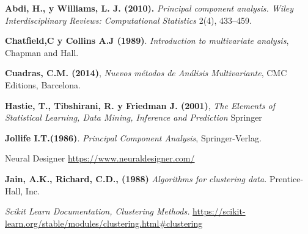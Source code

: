 
\begin{thebibliography}{99}
	

 \textbf{Abdi, H., y Williams, L. J. (2010).} \textit{Principal component analysis. Wiley Interdisciplinary Reviews: Computational Statistics}  2(4), 433–459. 

 \textbf{Chatfield,C y Collins A.J (1989)}. {\em Introduction to multivariate analysis}, Chapman and Hall.

 \textbf{Cuadras, C.M. (2014)}, \textit{Nuevos métodos de Análisis Multivariante}, CMC Editions, Barcelona. 

 \textbf{Hastie, T., Tibshirani, R. y Friedman J. (2001)}, \textit{The Elements of Statistical Learning, Data Mining, Inference and Prediction} Springer 

 \textbf{Jollife I.T.(1986)}. {\em Principal Component Analysis}, Springer-Verlag.

 Neural Designer \url{https://www.neuraldesigner.com/}

 \textbf{Jain, A.K., Richard, C.D., (1988)} \textit{Algorithms for clustering data.} Prentice-Hall, Inc. 

 \textit{Scikit Learn Documentation, Clustering Methods. } \url{https://scikit-learn.org/stable/modules/clustering.html#clustering}

          
        
\end{thebibliography}
 